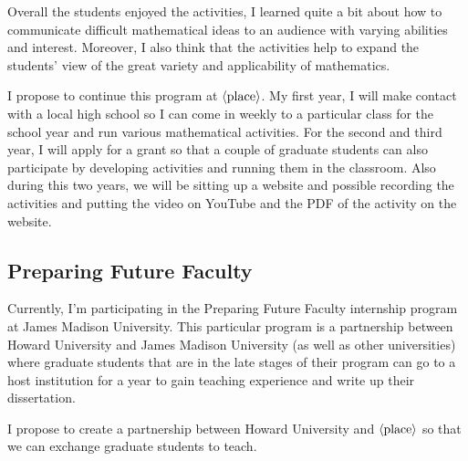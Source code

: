 \documentclass[12pt]{article}
\theoremstyle{plain}
\theoremstyle{definition}
\newcommand{\la}{\langle}
\newcommand{\ra}{\rangle}
\begin{document}
Overall the students enjoyed the activities, I learned quite a bit
about how to communicate difficult mathematical ideas to an audience
with varying abilities and interest. 
Moreover, I also think that the activities help to expand the
students' view of the great variety and applicability of mathematics. 

I propose to continue this program at $\la\hbox{place}\ra$.
My first year, I will make contact with a local high school so I can
come in weekly to a particular class for the school year and run
various mathematical activities. 
For the second and third year, I will apply for a grant so that a
couple of graduate students can also participate by developing
activities and running them in the classroom. 
Also during this two years, we will be sitting up a website and
possible recording the activities and putting the video on YouTube and
the PDF of the activity on the website.

\subsection{Preparing Future Faculty}
Currently, I'm participating in the Preparing Future Faculty
internship program at James Madison University. 
This particular program is a partnership between Howard University and
James Madison University (as well as other universities) where
graduate students that are in the late stages of their program can go
to a host institution  for a year to gain teaching experience and
write up their dissertation. 

I propose to create a partnership between Howard University and
$\la\hbox{place}\ra$ so that we can exchange graduate
students to teach. 




\end{document}
